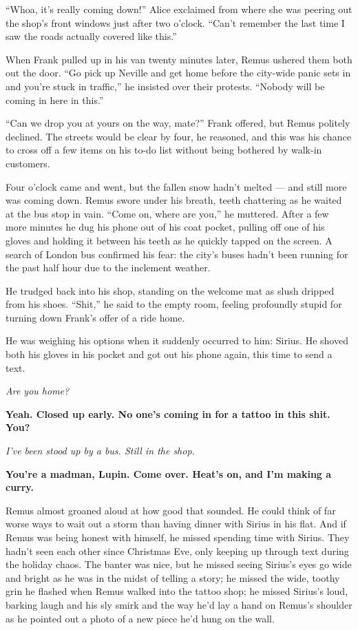 “Whoa, it’s really coming down!” Alice exclaimed from where she was peering out the shop’s front windows just after two o’clock. “Can’t remember the last time I saw the roads actually covered like this.”

When Frank pulled up in his van twenty minutes later, Remus ushered them both out the door. “Go pick up Neville and get home before the city-wide panic sets in and you’re stuck in traffic,” he insisted over their protests. “Nobody will be coming in here in this.”

“Can we drop you at yours on the way, mate?” Frank offered, but Remus politely declined. The streets would be clear by four, he reasoned, and this was his chance to cross off a few items on his to-do list without being bothered by walk-in customers.

Four o’clock came and went, but the fallen snow hadn’t melted — and still more was coming down. Remus swore under his breath, teeth chattering as he waited at the bus stop in vain. “Come on, where are you,” he muttered. After a few more minutes he dug his phone out of his coat pocket, pulling off one of his gloves and holding it between his teeth as he quickly tapped on the screen. A search of London bus confirmed his fear: the city’s buses hadn’t been running for the past half hour due to the inclement weather.

He trudged back into his shop, standing on the welcome mat as slush dripped from his shoes. “Shit,” he said to the empty room, feeling profoundly stupid for turning down Frank’s offer of a ride home.

He was weighing his options when it suddenly occurred to him: Sirius. He shoved both his gloves in his pocket and got out his phone again, this time to send a text.

\textit{Are you home?}

\textbf{Yeah. Closed up early. No one’s coming in for a tattoo in this shit. You?}

\textit{I’ve been stood up by a bus. Still in the shop.}

\textbf{You’re a madman, Lupin. Come over. Heat’s on, and I’m making a curry.}

Remus almost groaned aloud at how good that sounded. He could think of far worse ways to wait out a storm than having dinner with Sirius in his flat. And if Remus was being honest with himself, he missed spending time with Sirius. They hadn’t seen each other since Christmas Eve, only keeping up through text during the holiday chaos. The banter was nice, but he missed seeing Sirius’s eyes go wide and bright as he was in the midst of telling a story; he missed the wide, toothy grin he flashed when Remus walked into the tattoo shop; he missed Sirius’s loud, barking laugh and his sly smirk and the way he’d lay a hand on Remus’s shoulder as he pointed out a photo of a new piece he’d hung on the wall.

